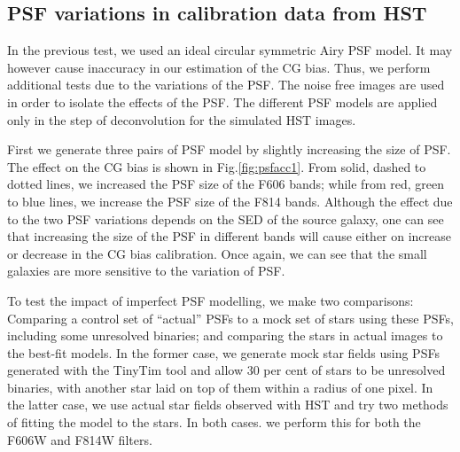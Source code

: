 \documentclass[useAMS,usenatbib]{mn2e}
\begin{document}
\subsection{PSF variations in calibration data from HST}

In the previous test, we used an ideal circular symmetric Airy PSF
model. It may however cause inaccuracy in our estimation of the CG
bias. Thus, we perform additional tests due to the variations of the
PSF. The noise free images are used in order to isolate the effects of
the PSF. The different PSF models are applied only in the step of
deconvolution for the simulated HST images.

First we generate three pairs of PSF model by slightly increasing the
size of PSF. The effect on the CG bias is shown in
Fig.\ref{fig:psfacc1}. From solid, dashed to dotted lines, we
increased the PSF size of the F606 bands; while from red, green to
blue lines, we increase the PSF size of the F814 bands. Although the
effect due to the two PSF variations depends on the SED of the source
galaxy, one can see that increasing the size of the PSF in different
bands will cause either on increase or decrease in the CG bias
calibration. Once again, we can see that the small galaxies are more
sensitive to the variation of PSF.

To test the impact of imperfect PSF modelling, we make two
comparisons: Comparing a control set of ``actual'' PSFs to a mock set
of stars using these PSFs, including some unresolved binaries; and
comparing the stars in actual images to the best-fit models. In the
former case, we generate mock star fields using PSFs generated with
the TinyTim tool \citep{2011SPIE.8127E..0JK} and allow 30 per cent of
stars to be unresolved binaries, with another star laid on top of them
within a radius of one pixel. In the latter case, we use actual star
fields observed with HST and try two methods of fitting the model to
the stars. In both cases. we perform this for both the F606W and F814W
filters.
\end{document}
